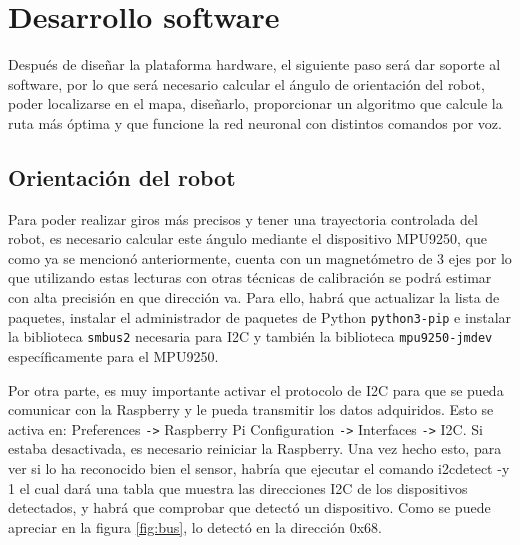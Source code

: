 \section{Desarrollo software}
\label{sec:desarrollo_software}

Después de diseñar la plataforma hardware, el siguiente paso será dar soporte al software, por lo que será necesario calcular el ángulo de orientación del robot, poder localizarse en el mapa, diseñarlo, proporcionar un algoritmo que calcule la ruta más óptima y que funcione la red neuronal con distintos comandos por voz.


\subsection{Orientación del robot}
\label{subsec:orientacion_robot}

Para poder realizar giros más precisos y tener una trayectoria controlada del robot, es necesario calcular este ángulo mediante el dispositivo MPU9250, que como ya se mencionó anteriormente, cuenta con un magnetómetro de 3 ejes por lo que utilizando estas lecturas con otras técnicas de calibración se podrá estimar con alta precisión en que dirección va. Para ello, habrá que actualizar la lista de paquetes, instalar el administrador de paquetes de Python \verb|python3-pip|  e instalar la biblioteca \verb|smbus2| necesaria para I2C y también la biblioteca \verb|mpu9250-jmdev| específicamente para el MPU9250.



Por otra parte, es muy importante activar el protocolo de I2C para que se pueda comunicar con la Raspberry y le pueda transmitir los datos adquiridos. Esto se activa en: Preferences \texttt{->} Raspberry Pi Configuration \texttt{->} Interfaces \texttt{->} I2C. Si estaba desactivada, es necesario reiniciar la Raspberry. Una vez hecho esto, para ver si lo ha reconocido bien el sensor, habría que ejecutar el comando i2cdetect -y 1 el cual dará una tabla que muestra las direcciones I2C de los dispositivos detectados, y habrá que comprobar que detectó un dispositivo. Como se puede apreciar en la figura \ref{fig:bus}, lo detectó en la dirección 0x68.


